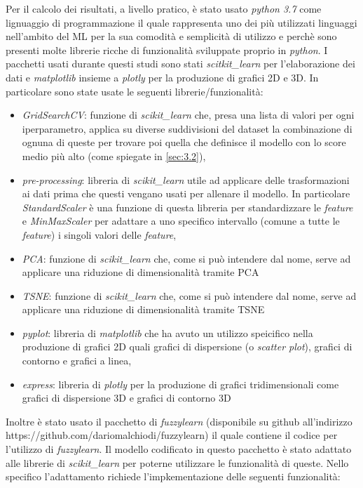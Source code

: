 \documentclass[12pt,italian]{report}
\begin{document}
Per il calcolo dei risultati, a livello pratico, è stato usato \emph{python 3.7} come lignuaggio di programmazione il quale rappresenta uno dei più utilizzati linguaggi nell'ambito del ML per la sua comodità e semplicità di utilizzo e perchè sono presenti molte librerie ricche di funzionalità sviluppate proprio in \emph{python}. I pacchetti usati durante questi studi sono stati \emph{scitkit\_learn} per l'elaborazione dei dati e \emph{matplotlib} insieme a \emph{plotly} per la produzione di grafici 2D e 3D. In particolare sono state usate le seguenti librerie/funzionalità:
\begin{itemize}
	\item{\emph{GridSearchCV}: funzione di \emph{scikit\_learn} che, presa una lista di valori per ogni iperparametro, applica su diverse suddivisioni del dataset la combinazione di ognuna di queste per trovare poi quella che definisce il modello con lo score medio più alto (come spiegate in \ref{sec:3.2}),}
	\item{\emph{pre-processing}: libreria di \emph{scikit\_learn} utile ad applicare delle trasformazioni ai dati prima che questi vengano usati per allenare il modello. In particolare \emph{StandardScaler} è una funzione di questa libreria per standardizzare le \emph{feature} e \emph{MinMaxScaler} per adattare a uno specifico intervallo (comune a tutte le \emph{feature}) i singoli valori delle \emph{feature},}
	\item{\emph{PCA}: funzione di \emph{scikit\_learn} che, come si può intendere dal nome, serve ad applicare una riduzione di dimensionalità tramite PCA}
	\item{\emph{TSNE}: funzione di \emph{scikit\_learn} che, come si può intendere dal nome, serve ad applicare una riduzione di dimensionalità tramite TSNE}
\item{\emph{pyplot}: libreria di \emph{matplotlib} che ha avuto un utilizzo speicifico nella produzione di grafici 2D quali grafici di dispersione (o \emph{scatter plot}), grafici di contorno e grafici a linea,}
\item{\emph{express}: libreria di \emph{plotly} per la produzione di grafici tridimensionali come grafici di dispersione 3D e grafici di contorno 3D}
\end{itemize}
Inoltre è stato usato il pacchetto di \emph{fuzzylearn} (disponibile su github all'indirizzo https://github.com/dariomalchiodi/fuzzylearn) il quale contiene il codice per l'utilizzo di \emph{fuzzylearn}. Il modello codificato in questo pacchetto è stato adattato alle librerie di \emph{scikit\_learn} per poterne utilizzare le funzionalità di queste. Nello specifico l'adattamento richiede l'impkementazione delle seguenti funzionalità:
\end{document}
